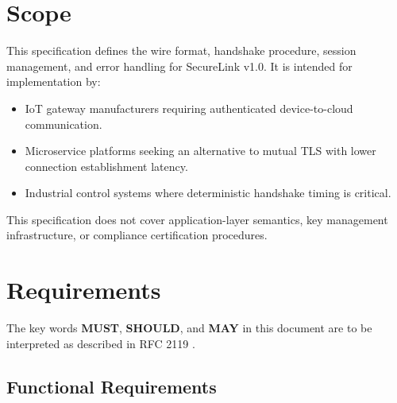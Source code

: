 \documentclass[
    language=english,
    doctype=article,
    institution=none,
]{../../omnilatex}
\begin{document}
\maketitle

\begin{abstract}
This document specifies the SecureLink transport protocol, a lightweight,
cryptographically authenticated protocol for secure machine-to-machine
communication in distributed systems.  SecureLink provides mutual
authentication, forward secrecy, and resistance to replay attacks while
imposing minimal computational overhead on constrained devices.
\end{abstract}

\tableofcontents

\section{Scope}

This specification defines the wire format, handshake procedure, session
management, and error handling for SecureLink v1.0.  It is intended for
implementation by:

\begin{itemize}
    \item IoT gateway manufacturers requiring authenticated device-to-cloud
          communication.
    \item Microservice platforms seeking an alternative to mutual TLS with
          lower connection establishment latency.
    \item Industrial control systems where deterministic handshake timing is
          critical.
\end{itemize}

This specification does not cover application-layer semantics, key management
infrastructure, or compliance certification procedures.

\section{Requirements}

The key words \textbf{MUST}, \textbf{SHOULD}, and \textbf{MAY} in this
document are to be interpreted as described in RFC 2119
\cite{rfc2119}.

\subsection{Functional Requirements}
\end{document}
